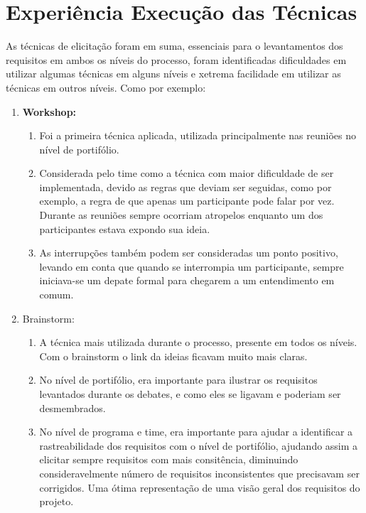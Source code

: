 \section{Experiência Execução das Técnicas}

As técnicas de elicitação foram em suma, essenciais para o levantamentos dos requisitos em ambos os  níveis do processo, foram identificadas dificuldades em utilizar algumas técnicas em alguns níveis e xetrema facilidade em utilizar as técnicas em outros níveis. Como por exemplo:


\begin{enumerate}
	\item \textbf{Workshop:}
		\begin{enumerate}
			\item Foi a primeira técnica aplicada, utilizada principalmente nas reuniões no nível de portifólio. 
	
			\item Considerada pelo time como a técnica com maior dificuldade de ser implementada, devido as regras que deviam ser seguidas, como por exemplo, a regra de que apenas um participante pode falar por vez. Durante as reuniões sempre ocorriam atropelos enquanto um dos participantes estava expondo sua ideia. 
	
			\item As interrupções também podem ser consideradas um ponto positivo, levando em conta que quando se interrompia um participante, sempre iniciava-se um depate formal para chegarem a um entendimento em comum. 
		\end{enumerate}
	
	\item Brainstorm:
		\begin{enumerate}
			\item A técnica mais utilizada durante o processo, presente em todos os níveis. Com o brainstorm o link da ideias ficavam muito mais claras.
	
			\item No nível de portifólio, era importante para ilustrar os requisitos levantados durante os debates, e como eles se ligavam e poderiam ser desmembrados.
	
			\item No nível de programa e time, era importante para ajudar a identificar a rastreabilidade dos requisitos com o nível de portifólio, ajudando assim a elicitar sempre requisitos com mais consitência, diminuindo consideravelmente número de requisitos inconsistentes que precisavam ser corrigidos.
	Uma ótima representação de uma visão geral dos requisitos do projeto.
		\end{enumerate}
	

\end{enumerate}
